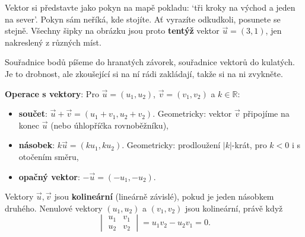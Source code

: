 Vektor si představte jako pokyn na mapě pokladu: `tři kroky na východ a jeden na sever'. Pokyn sám neříká, kde stojíte. Ať vyrazíte odkudkoli, posunete se stejně. Všechny šipky na obrázku jsou proto \textbf{tentýž} vektor $\vec{u} = (3, 1)$, jen nakreslený z různých míst.

\begin{center}
\end{center}

Souřadnice bodů píšeme do hranatých závorek, souřadnice vektorů do kulatých. Je to drobnost, ale zkoušející si na ní rádi zakládají, takže si na ni zvykněte.

\begin{definitionbox}
  \textbf{Operace s vektory}: Pro $\vec{u} = (u_1, u_2)$, $\vec{v} = (v_1, v_2)$ a $k\in\mathbb{R}$:
  \begin{itemize}
    \item \textbf{součet}: $\vec{u} + \vec{v} = (u_1 + v_1, u_2 + v_2)$. Geometricky: vektor $\vec{v}$ připojíme na konec $\vec{u}$ (nebo úhlopříčka rovnoběžníku),
    \item \textbf{násobek}: $k\vec{u} = (ku_1, ku_2)$. Geometricky: prodloužení $|k|$-krát, pro $k < 0$ i s otočením směru,
    \item \textbf{opačný vektor}: $-\vec{u} = (-u_1, -u_2)$.
  \end{itemize}
  Vektory $\vec{u}, \vec{v}$ jsou \textbf{kolineární} (lineárně závislé), pokud je jeden násobkem druhého. Nenulové vektory $(u_1, u_2)$ a $(v_1, v_2)$ jsou kolineární, právě když
  \begin{equation*}
    \begin{vmatrix} u_1 & v_1\\ u_2 & v_2 \end{vmatrix} = u_1v_2 - u_2v_1 = 0.
  \end{equation*}
\end{definitionbox}

